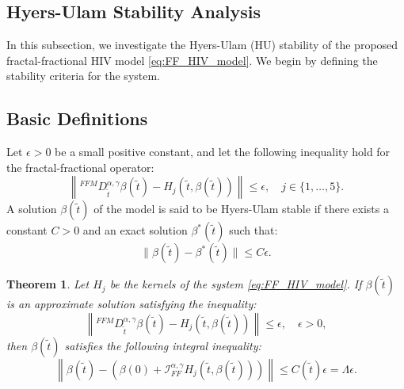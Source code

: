 \documentclass{article}
\theoremstyle{plain}
\newtheorem{theorem}{Theorem}[section]
\theoremstyle{definition}
\numberwithin{equation}{section}
\begin{document}
\subsection{Hyers-Ulam Stability Analysis}
In this subsection, we investigate the Hyers-Ulam (HU) stability of the proposed fractal-fractional HIV model \eqref{eq:FF_HIV_model}. We begin by defining the stability criteria for the system.
\subsection{Basic Definitions}
Let $\epsilon > 0$ be a small positive constant, and let the following inequality hold for the fractal-fractional operator:
\begin{equation}
	\left\| {}^{FFM}D_{\tilde{t}}^{\alpha,\gamma} \beta(\tilde{t}) - H_j(\tilde{t}, \beta(\tilde{t})) \right\| \leq \epsilon, \quad j \in \{1, \dots, 5\}.
\end{equation}
A solution $\beta(\tilde{t})$ of the model is said to be Hyers-Ulam stable if there exists a constant $C > 0$ and an exact solution $\beta^*(\tilde{t})$ such that:
\begin{equation}
	\|\beta(\tilde{t}) - \beta^*(\tilde{t})\| \leq C \epsilon.
\end{equation}
\begin{theorem}\label{thm:6.1}
Let $H_j$ be the kernels of the system \eqref{eq:FF_HIV_model}. If $\beta(\tilde{t})$ is an approximate solution satisfying the inequality:
\begin{equation}
    \left\| {}^{FFM}D_{\tilde{t}}^{\alpha,\gamma} \beta
    (\tilde{t}) - H_j(\tilde{t}, \beta(\tilde{t})) \right\| \leq \epsilon, \quad \epsilon > 0,
\end{equation}
then $\beta(\tilde{t})$ satisfies the following integral inequality:
\begin{equation}
    \left\| \beta(\tilde{t}) - \left( \beta(0) + \mathcal{I}_{FF}^{\alpha, \gamma} H_j(\tilde{t}, \beta(\tilde{t})) \right) \right\| \leq C(\tilde{t}) \epsilon = \Lambda \epsilon.
\end{equation}
\end{theorem}
\end{document}
